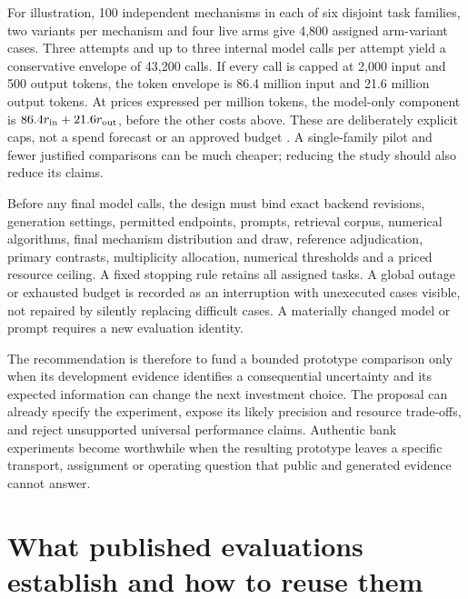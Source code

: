 For illustration, 100 independent mechanisms in each of six disjoint
task families, two variants per mechanism and four live arms give 4,800
assigned arm-variant cases. Three attempts and up to three internal
model calls per attempt yield a conservative envelope of 43,200 calls.
If every call is capped at 2,000 input and 500 output tokens, the token
envelope is 86.4 million input and 21.6 million output tokens. At prices
expressed per million tokens, the model-only component is
\(86.4r_{\rm in}+21.6r_{\rm out}\), before the other costs above. These
are deliberately explicit caps, not a spend forecast or an approved
budget \citep{exec13_live_planning}. A single-family pilot and fewer
justified comparisons can be much cheaper; reducing the study should
also reduce its claims.

Before any final model calls, the design must bind exact backend
revisions, generation settings, permitted endpoints, prompts, retrieval
corpus, numerical algorithms, final mechanism distribution and draw,
reference adjudication, primary contrasts, multiplicity allocation,
numerical thresholds and a priced resource ceiling. A fixed stopping
rule retains all assigned tasks. A global outage or exhausted budget is
recorded as an interruption with unexecuted cases visible, not repaired
by silently replacing difficult cases. A materially changed model or
prompt requires a new evaluation identity.

The recommendation is therefore to fund a bounded prototype comparison
only when its development evidence identifies a consequential
uncertainty and its expected information can change the next investment
choice. The proposal can already specify the experiment, expose its
likely precision and resource trade-offs, and reject unsupported
universal performance claims. Authentic bank experiments become
worthwhile when the resulting prototype leaves a specific transport,
assignment or operating question that public and generated evidence
cannot answer.

\label{exec13:live-design-end}


\hypertarget{what-published-evaluations-establish-and-how-to-reuse-them}{%
\section{What published evaluations establish and how to reuse
them}\label{what-published-evaluations-establish-and-how-to-reuse-them}}

